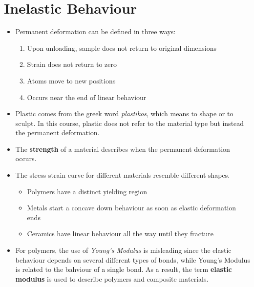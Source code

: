 \section{Inelastic Behaviour}
\begin{itemize}
    \item Permanent deformation can be defined in three ways:
    \begin{enumerate}
        \item Upon unloading, sample does not return to original dimensions
        \item Strain does not return to zero
        \item Atoms move to new positions
        \item Occurs near the end of linear behaviour
    \end{enumerate}
    \item Plastic comes from the greek word \textit{plastikos}, which means to shape or to sculpt. In this course, plastic does not refer to the material type but instead the permanent deformation.
    \item The \textbf{strength} of a material describes when the permanent deformation occurs.
    \item The stress strain curve for different materials resemble different shapes.
    \begin{itemize}
        \item Polymers have a distinct yielding region
        \item Metals start a concave down behaviour as soon as elastic deformation ends
        \item Ceramics have linear behaviour all the way until they fracture
    \end{itemize}
    \item For polymers, the use of \textit{Young's Modulus} is misleading since the elastic behaviour depends on several different types of bonds, while Young's Modulus is related to the bahviour of a single bond. As a result, the term \textbf{elastic modulus} is used to describe polymers and composite materials.
\end{itemize}